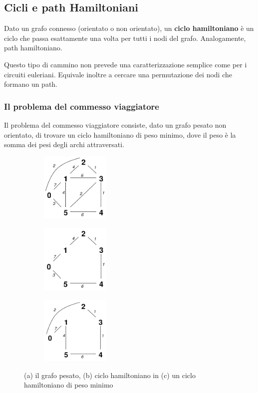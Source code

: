 \subsection{Cicli e path Hamiltoniani}
\begin{definition}
    Dato un grafo connesso (orientato o non orientato), un \textbf{ciclo hamiltoniano} è un ciclo che passa esattamente una volta per tutti i nodi del grafo. Analogamente, path hamiltoniano.
\end{definition}
Questo tipo di cammino non prevede una caratterizzazione semplice come per i circuiti euleriani. Equivale inoltre a cercare una permutazione dei nodi che formano un path.

\subsubsection{Il problema del commesso viaggiatore}
Il problema del commesso viaggiatore consiste, dato un grafo pesato non orientato, di trovare un ciclo hamiltoniano di peso minimo, dove il peso è la somma dei pesi degli archi attraversati.
\begin{figure}[h!]
    \centering
    \begin{subfigure}{.3\textwidth}
        \centering
        \includegraphics[width=3.3cm]{images/es-problema-viaggiatore-1.png}
        \caption{}
    \end{subfigure}
    \hfill
    \begin{subfigure}{.3\textwidth}
        \centering
        \includegraphics[width=3.3cm]{images/es-problema-viaggiatore-2.png}
        \caption{}
    \end{subfigure}
    \hfill
    \begin{subfigure}{.3\textwidth}
        \centering
        \includegraphics[width=3.3cm]{images/es-problema-viaggiatore-3.png}
        \caption{}
    \end{subfigure}
    \caption{(a) il grafo pesato, (b) ciclo hamiltoniano in (c) un ciclo hamiltoniano di peso minimo}
\end{figure}

